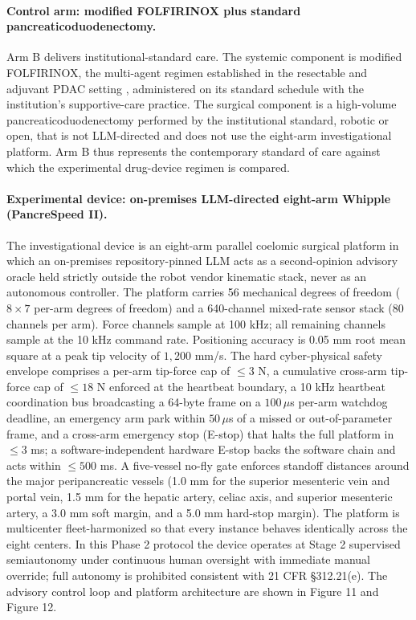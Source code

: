 \paragraph{Control arm: modified FOLFIRINOX plus standard pancreaticoduodenectomy.}
Arm B delivers institutional-standard care. The systemic component is modified
FOLFIRINOX, the multi-agent regimen established in the resectable and adjuvant PDAC
setting \cite{Conroy2018}, administered on its standard schedule with the
institution's supportive-care practice. The surgical component is a high-volume
pancreaticoduodenectomy performed by the institutional standard, robotic or open,
that is not LLM-directed and does not use the eight-arm investigational platform.
Arm B thus represents the contemporary standard of care against which the
experimental drug-device regimen is compared.

\paragraph{Experimental device: on-premises LLM-directed eight-arm Whipple (PancreSpeed II).}
The investigational device is an eight-arm parallel coelomic surgical platform in
which an on-premises repository-pinned LLM acts as a second-opinion advisory oracle
held strictly outside the robot vendor kinematic stack, never as an autonomous
controller. The platform carries 56 mechanical degrees of freedom ($8\times7$
per-arm degrees of freedom) and a 640-channel mixed-rate sensor stack (80 channels
per arm). Force channels sample at 100 kHz; all remaining channels sample at the
10 kHz command rate. Positioning accuracy is 0.05 mm root mean square at a peak tip
velocity of $1{,}200$ mm/s. The hard cyber-physical safety envelope comprises a
per-arm tip-force cap of $\leq 3$ N, a cumulative cross-arm tip-force cap of
$\leq 18$ N enforced at the heartbeat boundary, a 10 kHz heartbeat coordination bus
broadcasting a 64-byte frame on a $100\,\mu$s per-arm watchdog deadline, an
emergency arm park within $50\,\mu$s of a missed or out-of-parameter frame, and a
cross-arm emergency stop (E-stop) that halts the full platform in $\leq 3$ ms; a
software-independent hardware E-stop backs the software chain and acts within
$\leq 500$ ms. A five-vessel no-fly gate enforces standoff distances around the
major peripancreatic vessels (1.0 mm for the superior mesenteric vein and portal
vein, 1.5 mm for the hepatic artery, celiac axis, and superior mesenteric artery, a
3.0 mm soft margin, and a 5.0 mm hard-stop margin). The platform is multicenter
fleet-harmonized so that every instance behaves identically across the eight
centers. In this Phase 2 protocol the device operates at Stage 2 supervised
semiautonomy under continuous human oversight with immediate manual override; full
autonomy is prohibited consistent with 21 CFR \S312.21(e). The advisory control
loop and platform architecture are shown in Figure 11 and Figure 12.

